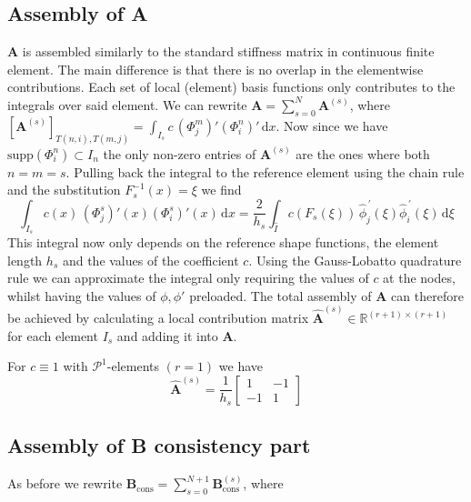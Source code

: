 \subsection{Assembly of A}
$\textbf{A}$ is assembled similarly to the standard stiffness matrix in continuous finite element. The main difference is that there is no overlap in the elementwise contributions.
Each set of local (element) basis functions only contributes to the integrals over said element.
We can rewrite $\textbf{A} = \sum_{s=0}^{N} \textbf{A}^{(s)}$, where
$[\textbf{A}^{(s)}]_{T(n,i),T(m,j)} = \int_{I_s} c \,(\Phi_j^m)' (\Phi_i^n)' \, \text{d}x$.
Now since we have $\text{supp}(\Phi_i^n)\subset I_n$ the only non-zero entries of $\textbf{A}^{(s)} $ are the ones where both $n=m=s$. Pulling back the integral
to the reference element using the chain rule and the substitution $F_s^{-1}(x) = \xi$ we find
\begin{equation*}
	\int_{I_s} c(x) \,(\Phi_j^s)'(x) (\Phi_i^s)'(x) \, \text{d}x =
	\frac{2}{h_s} \int_{\hat{I}} c(F_s(\xi)) \, \widehat{\phi}_j^{\, \prime}(\xi) \widehat{\phi}_i^{\, \prime}(\xi) \, \text{d}\xi
\end{equation*}
This integral now only depends on the reference shape functions, the element length $h_s$
and the values of the coefficient $c$. Using the Gauss-Lobatto quadrature rule we can approximate the integral
only requiring the values of $c$ at the nodes, whilst having the values of $\phi, \phi'$ preloaded.
The total assembly of $\textbf{A}$ can therefore be achieved by calculating a local contribution matrix
$\widehat{\textbf{A}}^{(s)} \in \mathbb{R}^{(r+1)\times (r+1)}$ for each element $I_s$ and adding it into $\textbf{A}$.
\begin{example}
	For $c\equiv 1$ with $\mathcal{P}^1$-elements $(r=1)$ we have
	\begin{equation*}
		\widehat{\textbf{A}}^{(s)} = \frac{1}{h_s}
		\begin{bmatrix}
			1  & -1 \\
			-1 & 1
		\end{bmatrix}
	\end{equation*}
\end{example}

\subsection{Assembly of B consistency part}
\label{subsec:assembly_cons}
As before we rewrite $\textbf{B}_{\text{cons}} = \sum_{s=0}^{N+1} \textbf{B}_{\text{cons}}^{(s)} $, where

